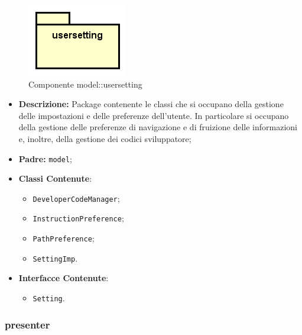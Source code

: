 \documentclass[../DefinizioneDiProdotto.tex]{subfiles}
\begin{document}
\begin{figure}[H]
	\centering
	\includegraphics[width=\maxwidth]{img/package/usersetting.png}
	\caption{Componente model::\-usersetting}\label{fig:model::usersetting} 
\end{figure}
\begin{itemize}
	\item \textbf{Descrizione:} Package contenente le classi che si occupano della gestione delle impostazioni e delle preferenze dell'utente. In particolare si occupano della gestione delle preferenze di navigazione e di fruizione delle informazioni e, inoltre, della gestione dei codici sviluppatore;
	\item \textbf{Padre:} \texttt{model};
	\item \textbf{Classi Contenute}:
	\begin{itemize}
		\item \texttt{DeveloperCodeManager};
		
		\item \texttt{InstructionPreference};
		
		\item \texttt{PathPreference};
		
		\item \texttt{SettingImp}.
		
	\end{itemize}
	\item \textbf{Interfacce Contenute}:
	\begin{itemize}
		\item \texttt{Setting}.
		
	\end{itemize}
\end{itemize}

\subsubsection{presenter}
\end{document}
